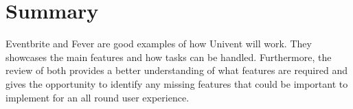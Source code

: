 \section{Summary}
Eventbrite and Fever are good examples of how Univent will work. They showcases the main features and how tasks can be handled.
Furthermore, the review of both provides a better understanding of what features are required and gives the opportunity to identify any missing features that could be important to implement for an all round user experience.


